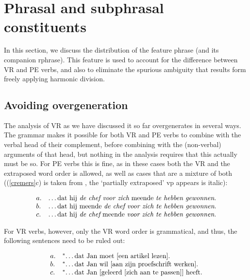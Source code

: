 \section{Phrasal and subphrasal constituents}

In this section, we discuss the distribution of the feature {\sc phrase} (and 
its
companion {\sc rphrase}).  This feature is used to account for the difference
between VR and PE verbs, and also to eliminate the spurious ambiguity that 
results
form freely applying harmonic division.

\subsection{Avoiding overgeneration}

The analysis of VR as we have discussed it so far overgenerates in several ways.
The grammar makes it possible for both VR and PE verbs to combine
with the verbal head of their complement, before combining with the (non-verbal)
arguments of that head, but nothing in the analysis requires that this actually
must be so.  For PE verbs this is fine, as in these cases both the VR and the
extraposed word order is allowed, as well as cases that are a mixture of both 
((\ref{cremers}c) is taken from , the `partially 
extraposed' {\sc 
vp} appears is italic):

\begin{equation}
\label{cremers}
\begin{array}[t]{ll@{\hspace{0cm}}l}
a. && \ldots\mbox{dat hij {\em de chef voor zich} meende {\em te hebben 
gewonnen}}. \\
b. && \ldots\mbox{dat hij meende {\em de chef voor zich te hebben gewonnen}}. \\
c. && \ldots\mbox{dat hij  {\em de chef} meende {\em voor zich te hebben 
gewonnen}}. \\
\end{array}
\end{equation}

\noindent For VR verbs, however, only the VR word order is grammatical, and 
thus, 
the
following sentences need to be ruled out:

\begin{equation}
\label{ungramm}
\begin{array}[t]{ll@{\hspace{0cm}}l}
a. &^*& \ldots\mbox{dat Jan moet [een artikel lezen]}. \\
b. &^*& \ldots\mbox{dat Jan wil [aan zijn proefschrift werken]}. \\
c. &^*& \ldots\mbox{dat Jan [geleerd [zich aan te passen]] heeft}.
\end{array}
\end{equation}


